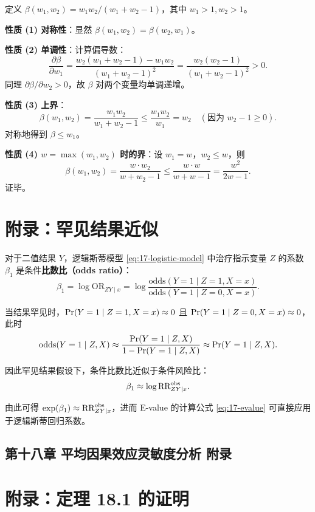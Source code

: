 定义 $\beta(w_1, w_2) = w_1 w_2 / (w_1 + w_2 - 1)$，其中 $w_1 > 1, w_2 > 1$。

\textbf{性质 (1) 对称性}：显然 $\beta(w_1, w_2) = \beta(w_2, w_1)$。

\textbf{性质 (2) 单调性}：计算偏导数：
\[
\frac{\partial \beta}{\partial w_1} = \frac{w_2 (w_1 + w_2 - 1) - w_1 w_2}{(w_1 + w_2 - 1)^2} = \frac{w_2 (w_2 - 1)}{(w_1 + w_2 - 1)^2} > 0 .
\]
同理 $\partial \beta / \partial w_2 > 0$，故 $\beta$ 对两个变量均单调递增。

\textbf{性质 (3) 上界}：
\[
\beta(w_1, w_2) = \frac{w_1 w_2}{w_1 + w_2 - 1} \leq \frac{w_1 w_2}{w_1} = w_2 \quad (\text{因为 } w_2 - 1 \geq 0) .
\]
对称地得到 $\beta \leq w_1$。

\textbf{性质 (4) $w = \max(w_1, w_2)$ 时的界}：设 $w_1 = w$，$w_2 \leq w$，则
\[
\beta(w_1, w_2) = \frac{w \cdot w_2}{w + w_2 - 1} \leq \frac{w \cdot w}{w + w - 1} = \frac{w^2}{2w - 1} .
\]
证毕。

\chapter{附录：罕见结果近似}\label{sec:appendix-17-rare-approx}

对于二值结果 $Y$，逻辑斯蒂模型 \cref{eq:17-logistic-model} 中治疗指示变量 $Z$ 的系数 $\beta_1$ 是条件\textbf{比数比（odds ratio）}：
\[
\beta_1 = \log \mathrm{OR}_{ZY\mid x} = \log \frac{\mathrm{odds}(Y=1 \mid Z=1, X=x)}{\mathrm{odds}(Y=1 \mid Z=0, X=x)} .
\]

当结果罕见时，$\operatorname{Pr}(Y=1 \mid Z=1, X=x) \approx 0$ 且 $\operatorname{Pr}(Y=1 \mid Z=0, X=x) \approx 0$，此时
\[
\mathrm{odds}(Y=1 \mid Z, X) \approx \frac{\operatorname{Pr}(Y=1 \mid Z, X)}{1 - \operatorname{Pr}(Y=1 \mid Z, X)} \approx \operatorname{Pr}(Y=1 \mid Z, X) .
\]

因此罕见结果假设下，条件比数比近似于条件风险比：
\[
\beta_1 \approx \log \text{RR}_{ZY\mid x}^{\mathrm{obs}} .
\]

由此可得 $\exp(\beta_1) \approx \text{RR}_{ZY\mid x}^{\mathrm{obs}}$，进而 E-value 的计算公式 \cref{eq:17-evalue} 可直接应用于逻辑斯蒂回归系数。


\section{第十八章 平均因果效应灵敏度分析 附录}
\chapter{附录：定理 18.1 的证明}\label{sec:appendix-18-theorem-1}

